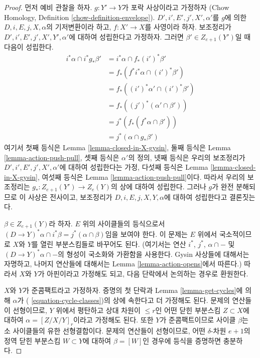 \begin{proof}
먼저 예비 관찰을 하자. $g : Y' \to Y$가 포락 사상이라고 가정하자
(Chow Homology, Definition \ref{chow-definition-envelope}).
$D', i', E', j', X', \alpha'$를 $g$에 의한
$D, i, E, j, X, \alpha$의 기저변환이라 하고, $f : X' \to X$를
사영이라 하자. 보조정리가 $D', i', E', j', X', Y', \alpha'$에
대하여 성립한다고 가정하자. 그러면 $\beta' \in Z_{e + 1}(Y')$일 때
다음이 성립한다.
\begin{align*}
i^*\alpha \cap i^*g_*\beta'
& =
i^*\alpha \cap f_*(i')^*\beta' \\
& =
f_*(f^*i^*\alpha \cap (i')^*\beta') \\
& =
f_*((i')^*\alpha' \cap (i')^*\beta') \\
& =
f_*((j')^*(\alpha' \cap \beta')) \\
& =
j^*(f_*(f^*\alpha \cap \beta')) \\
& =
j^*(\alpha \cap g_*\beta')
\end{align*}
여기서 첫째 등식은 Lemma \ref{lemma-closed-in-X-gysin}, 둘째 등식은
Lemma \ref{lemma-action-push-pull}, 셋째 등식은 $\alpha'$의 정의,
넷째 등식은 우리의 보조정리가 $D', i', E', j', X', \alpha'$에 대하여
성립한다는 가정, 다섯째 등식은 Lemma
\ref{lemma-closed-in-X-gysin}, 여섯째 등식은 Lemma
\ref{lemma-action-push-pull}이다. 따라서 우리의 보조정리는
$g_* : Z_{e + 1}(Y') \to Z_e(Y)$의 상에 대하여 성립한다. 그러나
$g$가 완전 분해되므로 이 사상은 전사이고, 보조정리가
$D, i, E, j, X, Y, \alpha$에 대하여 성립한다고 결론짓는다.

\medskip\noindent
$\beta \in Z_{e + 1}(Y)$라 하자. $E$ 위의 사이클들의 등식으로서
$(D \to Y)^*\alpha \cap i^*\beta = j^*(\alpha \cap \beta)$임을
보여야 한다. 이 문제는 $E$ 위에서 국소적이므로 $X$와 $Y$를 열린
부분스킴들로 바꾸어도 된다. (여기서는 연산 $i^*$, $j^*$,
$\alpha \cap - $ 및 $(D \to Y)^*\alpha \cap -$의 형성이 국소화와
가환함을 사용한다. Gysin 사상들에 대해서는 자명하고, 나머지
연산들에 대해서는 Lemma \ref{lemma-action-opens}에서 따른다.) 따라서
$X$와 $Y$가 아핀이라고 가정해도 되고, 다음 단락에서 논의하는 경우로
환원한다.

\medskip\noindent
$X$와 $Y$가 준콤팩트라고 가정하자. 증명의 첫 단락과 Lemma
\ref{lemma-get-cycles}에 의해 $\alpha$가 (
\ref{equation-cycle-classes})의 상에 속한다고 더 가정해도 된다.
문제의 연산들이 선형이므로, $Y$ 위에서 평탄하고 상대 차원이
$\leq r$인 어떤 닫힌 부분스킴 $Z \subset X$에 대하여
$\alpha = [Z/X/Y]_r$이라고 가정해도 된다. 또한 $Y$가 준콤팩트이므로
사이클 $\beta$는 소 사이클들의 유한 선형결합이다. 문제의 연산들이
선형이므로, 어떤 $\delta$-차원 $e + 1$의 정역 닫힌 부분스킴
$W \subset Y$에 대하여 $\beta = [W]$인 경우에 등식을 증명하면
충분하다.


\end{proof}
